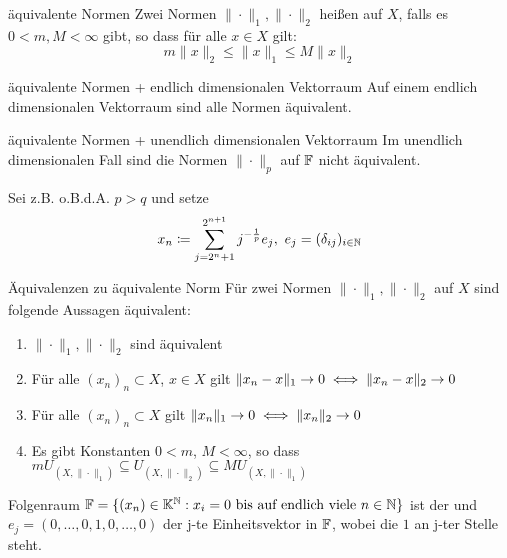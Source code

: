 	\begin{karte}{äquivalente Normen}
		Zwei Normen $\| \cdot \|_{1}, \| \cdot \|_{2}$ hei{\ss}en  auf $X$, falls es $0 < m, M < \infty$ gibt, so dass für alle $ x \in X$ gilt:
		\[ m \| x \|_{2} \leq \| x \|_{1} \leq M \| x \|_{2} \]
	\end{karte}
	
	\begin{karte}{äquivalente Normen + endlich dimensionalen Vektorraum}
		Auf einem endlich dimensionalen Vektorraum sind alle Normen äquivalent.
	\end{karte}
	
	\begin{karte}{äquivalente Normen + unendlich dimensionalen Vektorraum}
		Im unendlich dimensionalen Fall sind die Normen $\| \cdot \|_{p}$ auf $\mathbb{F}$ nicht äquivalent.
	
		Sei z.B. o.B.d.A. $p > q$ und setze 
		\[ x_{n} \coloneqq \sum_{j = 2^{n} + 1}^{2^{n + 1}} j^{-\frac{1}{p}}e_{j}, ~ e_{j} = ( \delta_{ij} )_{i \in \mathbb{N}} \]
	\end{karte}
	
	\begin{karte}{Äquivalenzen zu äquivalente Norm}
		Für zwei Normen $\| \cdot \|_{1}, \| \cdot \|_{2}$ auf $X$ sind folgende Aussagen äquivalent:
		\begin{enumerate}[label=\alph*\upshape)]
			\item $\| \cdot \|_{1}, \| \cdot \|_{2}$ sind äquivalent
			\item Für alle $(x_{n})_{n} \subset X$, $x \in X$ gilt $\| x_{n} - x \|_{1} \rightarrow 0 \iff \| x_{n} - x \|_{2} \rightarrow 0 $
			\item Für alle $(x_{n})_{n} \subset X$ gilt $\| x_{n} \|_{1} \rightarrow 0 \iff \| x_{n} \|_{2} \rightarrow 0 $
			\item Es gibt Konstanten $0 < m$, $M < \infty$, so dass $m U_{(X, \| \cdot \|_{1})} \subseteq U_{(X, \| \cdot \|_{2})} \subseteq M U_{(X, \| \cdot \|_{1})}$
		\end{enumerate}
	\end{karte}
	
	\begin{karte}{Folgenraum}	
		$\mathbb{F} = \{ (x_{n}) \in \mathbb{K}^{\mathbb{N}}: x_{i} = 0 \text{ bis auf endlich viele } n \in \mathbb{N} \} $ ist der  und $e_{j} = (0, \dotsc, 0, 1, 0, \dotsc, 0) $ der j-te Einheitsvektor in $\mathbb{F}$, wobei die $1$ an j-ter Stelle steht.
	\end{karte}		

